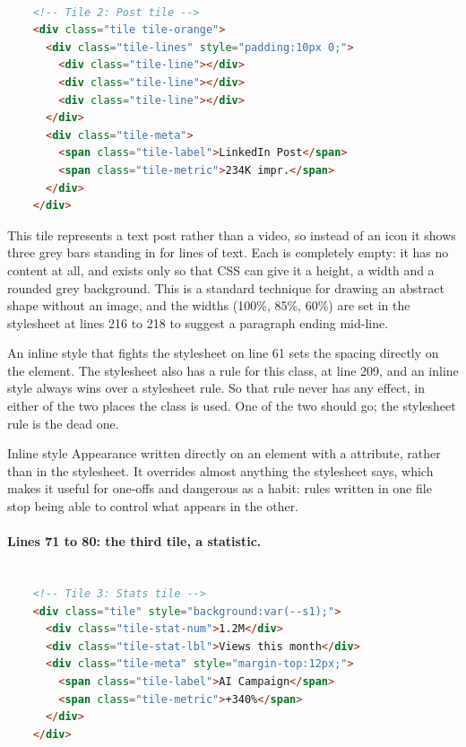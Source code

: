 \begin{lstlisting}[language=HTML,firstnumber=58,caption={\file{index.html}, lines 58--70}]

    <!-- Tile 2: Post tile -->
    <div class="tile tile-orange">
      <div class="tile-lines" style="padding:10px 0;">
        <div class="tile-line"></div>
        <div class="tile-line"></div>
        <div class="tile-line"></div>
      </div>
      <div class="tile-meta">
        <span class="tile-label">LinkedIn Post</span>
        <span class="tile-metric">234K impr.</span>
      </div>
    </div>
\end{lstlisting}

This tile represents a text post rather than a video, so instead of an icon it
shows three grey bars standing in for lines of text. Each  is completely empty: it has no content at all, and exists
only so that CSS can give it a height, a width and a rounded grey background.
This is a standard technique for drawing an abstract shape without an image, and
the widths (100\%, 85\%, 60\%) are set in the stylesheet at lines 216 to 218 to
suggest a paragraph ending mid-line.

\begin{honest}{An inline style that fights the stylesheet}
 on line 61 sets the spacing directly on the
element. The stylesheet also has a rule for this class,  at line 209, and an inline style always wins over a stylesheet
rule. So that rule never has any effect, in either of the two places the class is
used. One of the two should go; the stylesheet rule is the dead one.
\end{honest}

\begin{jargon}{Inline style}
Appearance written directly on an element with a  attribute, rather
than in the stylesheet. It overrides almost anything the stylesheet says, which
makes it useful for one-offs and dangerous as a habit: rules written in one file
stop being able to control what appears in the other.
\end{jargon}

\paragraph{Lines 71 to 80: the third tile, a statistic.}

\begin{lstlisting}[language=HTML,firstnumber=71,caption={\file{index.html}, lines 71--80}]

    <!-- Tile 3: Stats tile -->
    <div class="tile" style="background:var(--s1);">
      <div class="tile-stat-num">1.2M</div>
      <div class="tile-stat-lbl">Views this month</div>
      <div class="tile-meta" style="margin-top:12px;">
        <span class="tile-label">AI Campaign</span>
        <span class="tile-metric">+340%</span>
      </div>
    </div>
\end{lstlisting}

